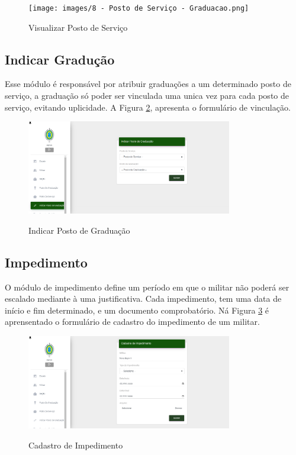 \begin{figure}[!htb]
    \centering
    \caption{Visualizar Posto de Serviço }
    \texttt{[image: images/8 - Posto de Serviço - Graduacao.png]}
    \label{fig:viewpostoservico}
\end{figure}

\subsection{Indicar Gradução}

Esse módulo é responsável por atribuir graduações a um determinado posto de serviço, a graduação só poder ser vinculada uma unica vez para cada posto de serviço, evitando uplicidade. A Figura \ref{fig:indicargraducao}, apresenta o formulário de vinculação.

\begin{figure}[H]
    \centering
    \caption{Indicar Posto de Graduação}
    \includegraphics[width=0.8\textwidth]{images/9 - Indicar Graduação.png}
    \label{fig:indicargraducao}
\end{figure}

\subsection{Impedimento}

O módulo de impedimento define um período em que o militar não poderá ser escalado mediante à uma justificativa. Cada impedimento, tem uma data de início e fim determinado, e um documento comprobatório. Ná Figura \ref{fig:impedimento} é aprensentado o formulário de cadastro do impedimento de um militar.

\begin{figure}[H]
    \centering
    \caption{Cadastro de Impedimento}
    \includegraphics[width=0.8\textwidth]{images/11 - Impedimento.png}
    \label{fig:impedimento}
\end{figure}

